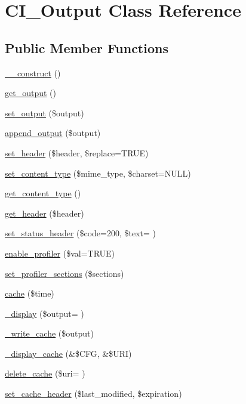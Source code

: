 \hypertarget{class_c_i___output}{}\section{C\+I\+\_\+\+Output Class Reference}
\label{class_c_i___output}
\subsection*{Public Member Functions}
\begin{DoxyCompactItemize}
\item 
\hyperlink{class_c_i___output_a095c5d389db211932136b53f25f39685}{\+\_\+\+\_\+construct} ()
\item 
\hyperlink{class_c_i___output_aa6c3f8688f804de4f1af8a462fffb922}{get\+\_\+output} ()
\item 
\hyperlink{class_c_i___output_afcff30d791a8006216f5c2fe93a95983}{set\+\_\+output} (\$output)
\item 
\hyperlink{class_c_i___output_a7c79b8239d6ecbba0c8fdd00bb619651}{append\+\_\+output} (\$output)
\item 
\hyperlink{class_c_i___output_a270389a1636faa81eda5ef3fa900ea25}{set\+\_\+header} (\$header, \$replace=T\+R\+U\+E)
\item 
\hyperlink{class_c_i___output_a7e04aad8dafeec2b8626285e81231f0c}{set\+\_\+content\+\_\+type} (\$mime\+\_\+type, \$charset=N\+U\+L\+L)
\item 
\hyperlink{class_c_i___output_a4d8c59d65c47c9146dbc1c7d0c4eccf2}{get\+\_\+content\+\_\+type} ()
\item 
\hyperlink{class_c_i___output_afc84ca7f4f93817160ea738f2f899a74}{get\+\_\+header} (\$header)
\item 
\hyperlink{class_c_i___output_ae5416517aea15ac6c9136ce83002002f}{set\+\_\+status\+\_\+header} (\$code=200, \$text= \textquotesingle{}\textquotesingle{})
\item 
\hyperlink{class_c_i___output_a7bd693db25952e1b074630f52ee67500}{enable\+\_\+profiler} (\$val=T\+R\+U\+E)
\item 
\hyperlink{class_c_i___output_ac5e50de443748cf3d356d29eba2caaaf}{set\+\_\+profiler\+\_\+sections} (\$sections)
\item 
\hyperlink{class_c_i___output_a6eae3cd828cf30926d44f1ab6011f939}{cache} (\$time)
\item 
\hyperlink{class_c_i___output_a16a22fa40f70c2b611fa9dd7e2a63ef1}{\+\_\+display} (\$output= \textquotesingle{}\textquotesingle{})
\item 
\hyperlink{class_c_i___output_a772aa9eb3f60f66fa194443ca0bdd8a4}{\+\_\+write\+\_\+cache} (\$output)
\item 
\hyperlink{class_c_i___output_acce78bdac02df9ab196a9c5939f6c4ab}{\+\_\+display\+\_\+cache} (\&\$C\+F\+G, \&\$U\+R\+I)
\item 
\hyperlink{class_c_i___output_a68c59ea9ca0ede1a05bc588c2da49b56}{delete\+\_\+cache} (\$uri= \textquotesingle{}\textquotesingle{})
\item 
\hyperlink{class_c_i___output_acd24befdfc26233abfbdc62071dcd58b}{set\+\_\+cache\+\_\+header} (\$last\+\_\+modified, \$expiration)
\end{DoxyCompactItemize}

